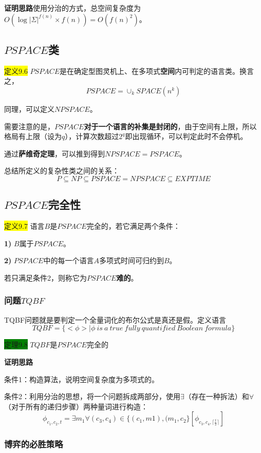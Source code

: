 \documentclass[a4paper]{article}
\begin{document}
		\textbf{证明思路}\quad 使用分治的方式，总空间复杂度为$O(\log{|\Sigma|^{f(n)}} \times f(n))=O(f(n)^2)$。

\subsection{$PSPACE$类}
	\colorbox{yellow}{定义9.6} $PSPACE$是在确定型图灵机上、在多项式\textbf{空间}内可判定的语言类。换言之，
		$$PSPACE=\cup_{k}{SPACE(n^k)}$$
	
	同理，可以定义$NPSPACE$。
	
	需要注意的是，\textbf{$PSPACE$对于一个语言的补集是封闭的}，由于空间有上限，所以格局有上限（设为$q$），计算次数超过$2^q$即出现循环，可以判定此时不会停机。
	
	通过\textbf{萨维奇定理}，可以推到得到$NPSPACE=PSPACE$。
	
	总结所定义的复杂性类之间的关系：
	$$ P\subseteq NP \subseteq PSPACE = NPSPACE \subseteq EXPTIME $$

\subsection{$PSPACE$完全性}
	\colorbox{yellow}{定义9.7} 语言$B$是$PSPACE$完全的，若它满足两个条件：
	
	\qquad \textbf{1)} $B$属于$PSPACE$。

	\qquad \textbf{2)} $PSPACE$中的每一个语言$A$多项式时间可归约到$B$。
	
	若只满足条件2，则称它为\textbf{$PSPACE$难的}。

\subsubsection{问题$TQBF$}

	TQBF问题就是要判定一个全量词化的布尔公式是真还是假。定义语言
	$$TQBF=\{<\phi>|\phi~is~a~true~fully~quantified~Boolean~formula\}$$
	
	\colorbox{green}{定理9.8} $TQBF$是$PSPACE$完全的
	
	\textbf{证明思路}
		
		\qquad 条件1：构造算法，说明空间复杂度为多项式的。
		
		\qquad 条件2：利用分治的思想，将一个问题拆成两部分，使用$\exists$（存在一种拆法）和$\forall$（对于所有的递归步骤）两种量词进行构造：
		$$\phi_{c_1,c_2,t}=\exists m_1 \forall (c_3,c_4)\in \{(c_1,m1), (m_1,c_2\}[\phi_{c_3,c_4,\lceil \frac{t}{2}\rceil}]$$
		
		
\subsubsection{博弈的必胜策略}
\end{document}

